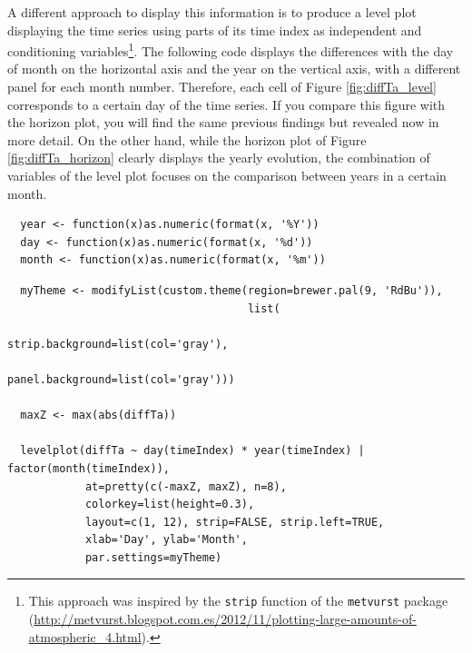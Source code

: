 \documentclass[smallroyalvopaper]{memoir}
\begin{document}
A different approach to display this information is to produce a level
plot displaying the time series using parts of its time index as
independent and conditioning variables\footnote{This approach was inspired by the \texttt{strip} function of the
\texttt{metvurst} package
(\url{http://metvurst.blogspot.com.es/2012/11/plotting-large-amounts-of-atmospheric\_4.html}).}. The following code
displays the differences with the day of month on the horizontal axis
and the year on the vertical axis, with a different panel for each
month number. Therefore, each cell of Figure \ref{fig:diffTa_level}
corresponds to a certain day of the time series. If you compare this
figure with the horizon plot, you will find the same previous findings
but revealed now in more detail. On the other hand, while the horizon
plot of Figure \ref{fig:diffTa_horizon} clearly displays the yearly
evolution, the combination of variables of the level plot focuses on
the comparison between years in a certain month.

\lstset{language=r,label= ,caption= ,captionpos=b,numbers=none}
\begin{lstlisting}
  year <- function(x)as.numeric(format(x, '%Y'))
  day <- function(x)as.numeric(format(x, '%d'))
  month <- function(x)as.numeric(format(x, '%m'))
\end{lstlisting}

\lstset{language=r,label= ,caption= ,captionpos=b,numbers=none}
\begin{lstlisting}
  myTheme <- modifyList(custom.theme(region=brewer.pal(9, 'RdBu')),
                                     list(
                                       strip.background=list(col='gray'),
                                       panel.background=list(col='gray')))
  
  maxZ <- max(abs(diffTa))
  
  levelplot(diffTa ~ day(timeIndex) * year(timeIndex) | factor(month(timeIndex)),
            at=pretty(c(-maxZ, maxZ), n=8),
            colorkey=list(height=0.3),
            layout=c(1, 12), strip=FALSE, strip.left=TRUE,
            xlab='Day', ylab='Month', 
            par.settings=myTheme)
\end{lstlisting}
\end{document}
